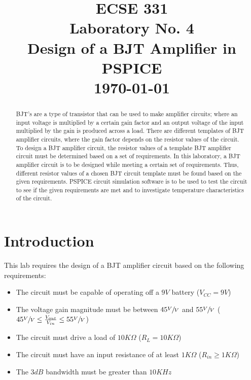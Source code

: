 \documentclass[conference]{IEEEtran}
\begin{document}
\title{ECSE 331\\
    Laboratory No. 4\\
    Design of a BJT Amplifier in PSPICE\\
    \Large \today\\
}

\author
{

    \and

}
\maketitle
\clearpage

\begin{abstract}
    BJT’s are a type of transistor that can be used to make amplifier circuits; where an input voltage is multiplied by a certain gain factor and an output voltage of the input multiplied by the gain is produced across a load. There are different templates of BJT amplifier circuits, where the gain factor depends on the resistor values of the circuit. To design a BJT amplifier circuit, the resistor values of a template BJT amplifier circuit must be determined based on a set of requirements. In this laboratory, a BJT amplifier circuit is to be designed while meeting a certain set of requirements. Thus, different resistor values of a chosen BJT circuit template must be found based on the given requirements. PSPICE circuit simulation software is to be used to test the circuit to see if the given requirements are met and to investigate temperature characteristics of the circuit.
\end{abstract}

\section{Introduction}
This lab requires the design of a BJT amplifier circuit based on the following requirements:

\begin{itemize}
    \item The circuit must be capable of operating off a $9V$ battery ($V_{CC} = 9V$)
    \item The voltage gain magnitude must be between $45\sfrac{V}{V}$ and $55\sfrac{V}{V}$ ($45\sfrac{V}{V} \leq \frac{V_{out}}{V_{in}} \leq 55\sfrac{V}{V}$)
    \item The circuit must drive a load of $10K\Omega$ ($R_L = 10K\Omega$)
    \item The circuit must have an input resistance of at least $1K\Omega$ ($R_{in} \geq 1K\Omega$)
    \item The $3dB$ bandwidth must be greater than $10KHz$\\

\end{itemize}
\end{document}
